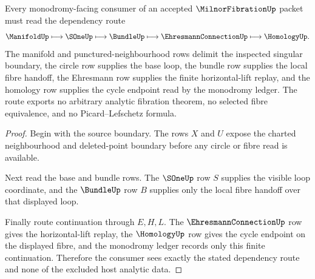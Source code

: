 \begin{theorem}
\label{thm:milnor-fibration-monodromy-route}
Every monodromy-facing consumer of an accepted $\MilnorFibrationUp$ packet must read the dependency route
$$
\ManifoldUp \longmapsto \SOneUp \longmapsto \BundleUp \longmapsto \EhresmannConnectionUp \longmapsto \HomologyUp .
$$
The manifold and punctured-neighbourhood rows delimit the inspected singular boundary, the circle row supplies the base loop, the bundle row supplies the local fibre handoff, the Ehresmann row supplies the finite horizontal-lift replay, and the homology row supplies the cycle endpoint read by the monodromy ledger. The route exports no arbitrary analytic fibration theorem, no selected fibre equivalence, and no Picard--Lefschetz formula.
\end{theorem}
\begin{proof}
Begin with the source boundary. The rows $X$ and $U$ expose the charted neighbourhood and deleted-point boundary before any circle or fibre read is available.

Next read the base and bundle rows. The $\SOneUp$ row $S$ supplies the visible loop coordinate, and the $\BundleUp$ row $B$ supplies only the local fibre handoff over that displayed loop.

Finally route continuation through $E,H,L$. The $\EhresmannConnectionUp$ row gives the horizontal-lift replay, the $\HomologyUp$ row gives the cycle endpoint on the displayed fibre, and the monodromy ledger records only this finite continuation. Therefore the consumer sees exactly the stated dependency route and none of the excluded host analytic data.
\end{proof}




